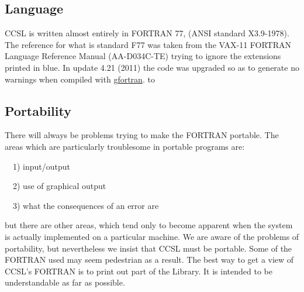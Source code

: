 \subsection{Language}
CCSL is written almost entirely in FORTRAN 77, (ANSI standard X3.9-1978). The
reference for what is standard F77 was taken from the VAX-11
FORTRAN Language Reference Manual (AA-D034C-TE) trying to ignore the
extensions printed in blue. In update 4.21 (2011) the code was
upgraded so as to generate no warnings when compiled with 
\href{http://gcc.gnu.org/fortran/}{gfortran}.
to 
\p 
\subsection{Portability}
There will always be problems trying to make the FORTRAN portable.
The areas which are particularly troublesome in portable programs are:
\p 
\begin{list} {} {\setlength{\labelwidth}{2 cm}
  \setlength{\parsep}{-1ex}
  \setlength{\leftmargin}{\labelwidth}
 \addtolength{\leftmargin}{5mm}}
\item[\ \ 1) \hfill] input/output
\item[\ \ 2) \hfill] use of graphical output
\item[\ \ 3) \hfill] what the consequences of an error are\end{list}
\par  
but there are other areas, which tend only to become apparent when the
system is actually implemented on a particular machine.
\p
We are aware of the problems of portability, but nevertheless we insist
that CCSL must be portable.  Some of the FORTRAN used may seem pedestrian
as a result. 
\p 
The best way to get a view of CCSL's FORTRAN is to print out part of
the Library.
It is intended to be understandable as far as possible.
\p 
